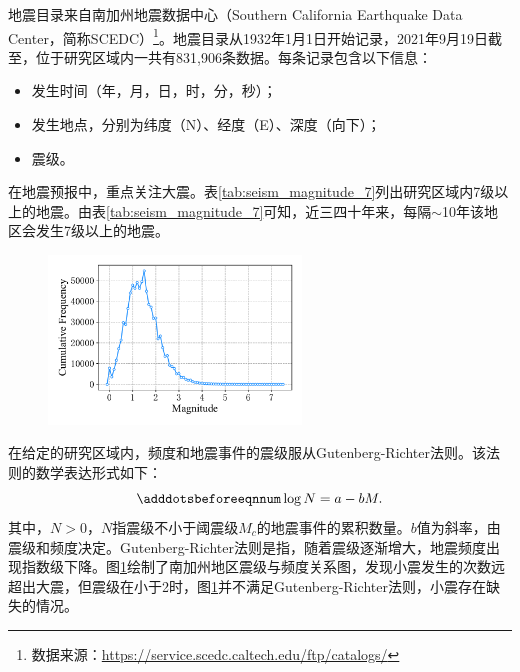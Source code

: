 地震目录来自南加州地震数据中心（Southern California Earthquake Data Center，简称SCEDC）\footnote{数据来源：\href{https://service.scedc.caltech.edu/ftp/catalogs/}{https://service.scedc.caltech.edu/ftp/catalogs/}}。地震目录从1932年1月1日开始记录，2021年9月19日截至，位于研究区域内一共有831,906条数据。每条记录包含以下信息：
\begin{itemize}
  \item[1] 发生时间（年，月，日，时，分，秒）；
  \item[2] 发生地点，分别为纬度（N）、经度（E）、深度（向下）；
  \item[3] 震级。
\end{itemize}

在地震预报中，重点关注大震。表\ref{tab:seism_magnitude_7}列出研究区域内7级以上的地震。由表\ref{tab:seism_magnitude_7}可知，近三四十年来，每隔$\sim$10年该地区会发生7级以上的地震。

\begin{figure}[!htbp]
  \centering
  \includegraphics[width=0.60\textwidth]{Img/chap5_seism/seism_m_f.pdf}
  \vspace{-0.5cm}
  \label{fig:seism_m_f}
\end{figure}

在给定的研究区域内，频度和地震事件的震级服从Gutenberg-Richter法则\citep{Gutenberg1994Frequency,Panakkat2007Neural}。该法则的数学表达形式如下：
\begin{equation}\adddotsbeforeeqnnum
  \label{eq:seism_Gutenberg-Richter}
  \log N=a-bM.
\end{equation}
其中，$N>0$，$N$指震级不小于阈震级$M_c$的地震事件的累积数量。$b$值为斜率，由震级和频度决定。Gutenberg-Richter法则是指，随着震级逐渐增大，地震频度出现指数级下降\citep{Asim2018Earthquake}。图\ref{fig:seism_m_f}绘制了南加州地区震级与频度关系图，发现小震发生的次数远超出大震，但震级在小于2时，图\ref{fig:seism_m_f}并不满足Gutenberg-Richter法则，小震存在缺失的情况。

